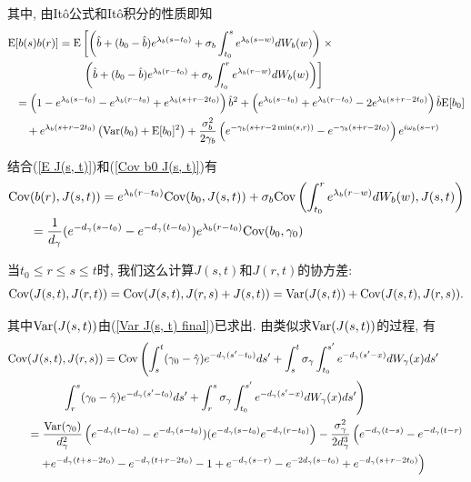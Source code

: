 \documentclass[notitlepage,cs4size,punct,oneside]{ctexrep}
\numberwithin{equation}{section}
\theoremstyle{mystyle}
\begin{document}
其中, 由It\^o公式和It\^o积分的性质即知
\[
\begin{split}
\text{E}&[b(s)b(r)] = \text{E}\left[\left(\hat{b}+(b_0-\hat{b})e^{\lambda_b(s-t_0)}+\sigma_b\int_{t_0}^s e^{\lambda_b(s-w)}dW_b(w)\right)\right.\times \\
&\quad\quad\quad\quad\quad\quad\left.\left(\hat{b}+(b_0-\hat{b})e^{\lambda_b(r-t_0)}+\sigma_b\int_{t_0}^r e^{\lambda_b(r-w)}dW_b(w)\right) \right] \\
&= \left(1-e^{\lambda_b(s-t_0)}-e^{\lambda_b(r-t_0)}+e^{\lambda_b(s+r-2t_0)}\right)\hat{b}^2 + \left(e^{\lambda_b(s-t_0)}+e^{\lambda_b(r-t_0)}-2e^{\lambda_b(s+r-2t_0)}\right)\hat{b}\text{E}[b_0] \\
&\quad + e^{\lambda_b(s+r-2t_0)}\left(\text{Var}(b_0) + \text{E}[b_0]^2\right) + \frac{\sigma_b^2}{2\gamma_b}\left(e^{-\gamma_b(s+r-2\min(s, r))}-e^{-\gamma_b(s+r-2t_0)}\right)e^{i\omega_b(s-r)}
\end{split}
\]

结合(\ref{E J(s, t)})和(\ref{Cov b0 J(s, t)})有
\[
\begin{split}
\text{Cov}&(b(r), J(s, t)) = e^{\lambda_b(r-t_0)}\text{Cov}(b_0, J(s, t)) + \sigma_b\text{Cov}\left(\int_{t_0}^r e^{\lambda_b(r-w)}dW_b(w), J(s, t)\right) \\
&= \frac{1}{d_\gamma}(e^{-d_\gamma(s-t_0)}-e^{-d_\gamma(t-t_0)})e^{\lambda_b(r-t_0)}\text{Cov}(b_0, \gamma_0)
\end{split}
\]

当$t_0 \leqslant r \leqslant s \leqslant t$时, 我们这么计算$J(s, t)$和$J(r, t)$的协方差:
\[
\text{Cov}(J(s, t), J(r, t)) = \text{Cov}(J(s, t), J(r, s)+J(s, t)) = \text{Var}(J(s, t)) + \text{Cov}(J(s, t), J(r, s)).
\]

其中$\text{Var}(J(s, t))$由(\ref{Var J(s, t) final})已求出. 由类似求$\text{Var}(J(s, t))$的过程, 有
\[
\begin{split}
\text{Cov}&(J(s, t), J(r, s)) = \text{Cov}\left(\int_s^t(\gamma_0-\hat{\gamma})e^{-d_\gamma(s'-t_0)}ds' +\int_s^t \sigma_\gamma\int_{t_0}^{s'} e^{-d_\gamma(s'-x)}dW_\gamma(x)ds'\right. \\
&\quad\quad\quad\left. \int_r^s(\gamma_0-\hat{\gamma})e^{-d_\gamma(s'-t_0)}ds' +\int_r^s \sigma_\gamma\int_{t_0}^{s'} e^{-d_\gamma(s'-x)}dW_\gamma(x)ds'\right) \\
&= \frac{\text{Var}(\gamma_0)}{d_\gamma^2}\left(e^{-d_\gamma(t-t_0)}-e^{-d_\gamma(s-t_0)})(e^{-d_\gamma(s-t_0)}e^{-d_\gamma(r-t_0)}\right)-\frac{\sigma_\gamma^2}{2d_\gamma^3}\left(e^{-d_\gamma(t-s)}-e^{-d_\gamma(t-r)}  \right.\\
&\left.\quad+e^{-d_\gamma(t+s-2t_0)}-e^{-d_\gamma(t+r-2t_0)}-1+e^{-d_\gamma(s-r)}-e^{-2d_\gamma(s-t_0)}+e^{-d_\gamma(s+r-2t_0)}\right)
\end{split}
\]
\end{document}
